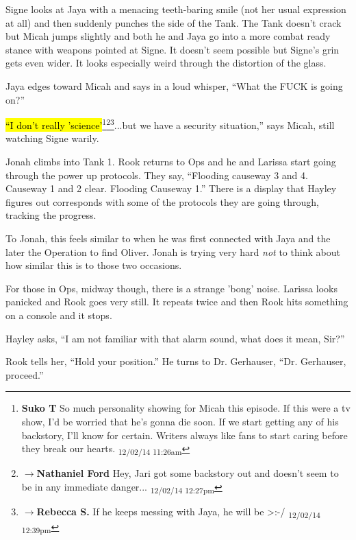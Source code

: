 Signe looks at Jaya with a menacing teeth-baring smile (not her usual expression at all) and then suddenly punches the side of the Tank.  The Tank doesn't crack but Micah jumps slightly and both he and Jaya go into a more combat ready stance with weapons pointed at Signe.  It doesn't seem possible but Signe's grin gets even wider.  It looks especially weird through the distortion of the glass.



Jaya edges toward Micah and says in a loud whisper, ``What the FUCK is going on?''

\hl{``I don't really 'science'}\footnote{\textbf{Suko T }So much personality showing for Micah this episode.  If this were a tv show, I'd be worried that he's gonna die soon.  If we start getting any of his backstory, I'll know for certain.  Writers always like fans to start caring before they break our hearts. \textsubscript{12/02/14 11:26am}}\footnote{$\rightarrow$\textbf{Nathaniel Ford }Hey, Jari got some backstory out and doesn't seem to be in any immediate danger... \textsubscript{12/02/14 12:27pm}}\footnote{$\rightarrow$\textbf{Rebecca S. }If he keeps messing with Jaya, he will be \textgreater :-/ \textsubscript{12/02/14 12:39pm}}...but we have a security situation,'' says Micah, still watching Signe warily.





Jonah climbs into Tank 1.  Rook returns to Ops and he and Larissa start going through the power up protocols.  They say, ``Flooding causeway 3 and 4.  Causeway 1 and 2 clear.  Flooding Causeway 1.'' There is a display that Hayley figures out corresponds with some of the protocols they are going through, tracking the progress.



To Jonah, this feels similar to when he was first connected with Jaya and the later the Operation to find Oliver.  Jonah is trying very hard \textit{not} to think about how similar this is to those two occasions.



For those in Ops, midway though, there is a strange 'bong' noise.  Larissa looks panicked and Rook goes very still.  It repeats twice and then Rook hits something on a console and it stops.



Hayley asks, ``I am not familiar with that alarm sound, what does it mean, Sir?''

Rook tells her, ``Hold your position.''  He turns to Dr. Gerhauser, ``Dr. Gerhauser, proceed.''

